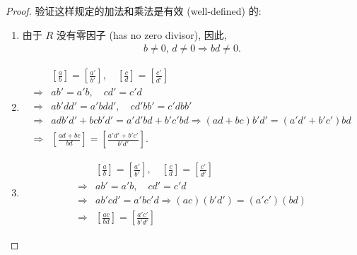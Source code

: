 \documentclass[utf8]{ctexbook}
\theoremstyle{definition}
\begin{document}
\begin{proof}
验证这样规定的加法和乘法是有效 (well-defined) 的:
\begin{enumerate}
\item{由于 $R$ 没有零因子 (has no zero divisor), 因此, 
\begin{align*}
b \neq 0, \, d \neq 0 \Longrightarrow bd \neq 0 .
\end{align*}
}
\item{
\begin{align*}
& \left[ \frac{a}{b} \right] = \left[ \frac{a'}{b'} \right] , \quad \left[ \frac{c}{d} \right] = \left[ \frac{c'}{d'} \right] \\
\Longrightarrow & ab' = a' b, \quad cd' = c' d \\
\Longrightarrow & a b' d d' = a' b d d', \quad c d' bb' = c'd bb' \\
\Longrightarrow & a d b' d' + b c b' d' = a' d' b d + b' c' b d \Longrightarrow ( a d  + b c ) b' d' = (a' d'  + b' c') b d  \\
\Longrightarrow & \left[ \frac{a d  + b c }{b d} \right] =  \left[ \frac{a' d'  + b' c'}{b' d'} \right] .
\end{align*}
}
\item{
\begin{align*}
& \left[ \frac{a}{b} \right] = \left[ \frac{a'}{b'} \right] , \quad \left[ \frac{c}{d} \right] = \left[ \frac{c'}{d'} \right] \\
\Longrightarrow & ab' = a' b, \quad cd' = c' d \\
\Longrightarrow & ab' c d' = a'b c' d \Longrightarrow (ac)(b'd') = (a'c') (bd) \\
\Longrightarrow & \left[ \frac{a c }{b d} \right] =  \left[ \frac{a'  c'}{b' d'} \right]
\end{align*}
}
\end{enumerate}


\end{proof}
\end{document}

